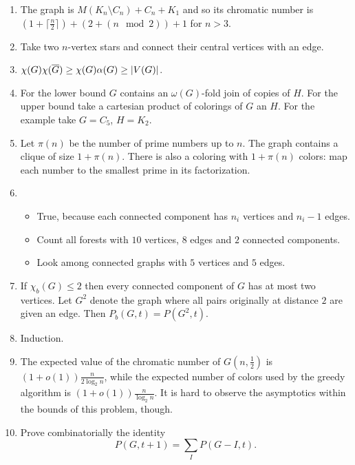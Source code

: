 \begin{enumerate}

\item The graph is $M(K_n\setminus C_n) + C_n + K_1$ and so its chromatic number is $(1+\lceil\frac{n}{2}\rceil) + (2+(n \mod 2)) + 1$ for $n>3$.

\item Take two $n$-vertex stars and connect their central vertices with an edge.

\item $\chi(G)\chi(\overline{G})\geq \chi(G)\alpha(G)\geq |V(G)|$.

\item For the lower bound $G$ contains an $\omega(G)$-fold join of copies of $H$. For the upper bound take a cartesian product of colorings of $G$ an $H$. For the example take $G=C_5$, $H=K_2$.

\item Let $\pi(n)$ be the number of prime numbers up to $n$. The graph contains a clique of size $1+\pi(n)$. There is also a coloring with $1+\pi(n)$ colors: map each number to the smallest prime in its factorization.

\item 
\begin{itemize}
\item True, because each connected component has $n_i$ vertices and $n_i-1$ edges.
\item Count all forests with $10$ vertices, $8$ edges and $2$ connected components. 
\item Look among connected graphs with $5$ vertices and $5$ edges.
\end{itemize}

\item If $\chi_b(G)\leq 2$ then every connected component of $G$ has at most two vertices. Let $G^2$ denote the graph where all pairs originally at distance $2$ are given an edge. Then $P_b(G,t)=P(G^2,t)$.

\item Induction. 

\item The expected value of the chromatic number of $G(n,\frac12)$ is $(1+o(1))\frac{n}{2\log_2n}$, while the expected number of colors used by the greedy algorithm is $(1+o(1))\frac{n}{\log_2n}$. It is hard to observe the asymptotics within the bounds of this problem, though.

\item Prove combinatorially the identity
$$P(G, t+1) = \sum_I P(G-I, t).$$


\end{enumerate}
